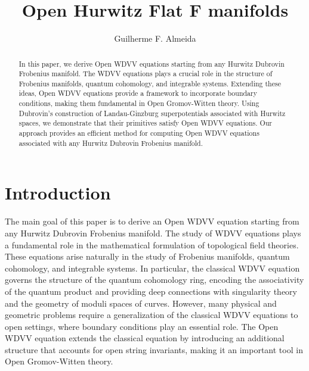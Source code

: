 \documentclass{article}
\theoremstyle{definition}
\begin{document}
 
\title{Open Hurwitz Flat F manifolds}
\author{Guilherme F. Almeida}
\affil{}
\date{}

\maketitle

\begin{abstract}

In this paper, we derive  Open WDVV equations starting from any Hurwitz Dubrovin Frobenius manifold. The WDVV equations plays a crucial role in the structure of Frobenius manifolds, quantum cohomology, and integrable systems. Extending these ideas, Open WDVV equations provide a framework to incorporate boundary conditions, making them fundamental in Open Gromov-Witten theory. Using Dubrovin’s construction of Landau-Ginzburg superpotentials associated with Hurwitz spaces, we demonstrate that their primitives satisfy  Open WDVV equations. Our approach provides an efficient method for computing Open WDVV equations associated with any Hurwitz Dubrovin Frobenius manifold.


\end{abstract}


\tableofcontents





\section{Introduction}
The main goal of this paper is to derive an Open WDVV equation starting from any Hurwitz Dubrovin Frobenius manifold. The study of WDVV equations plays a fundamental role in the mathematical formulation of topological field theories. These equations arise naturally in the study of Frobenius manifolds, quantum cohomology, and integrable systems. In particular, the classical WDVV equation governs the structure of the quantum cohomology ring, encoding the associativity of the quantum product and providing deep connections with singularity theory and the geometry of moduli spaces of curves. However, many physical and geometric problems require a generalization of the classical WDVV equations to open settings, where boundary conditions play an essential role. The Open WDVV equation extends the classical equation by introducing an additional structure that accounts for open string invariants, making it an important tool in Open Gromov-Witten theory. \\
\end{document}
